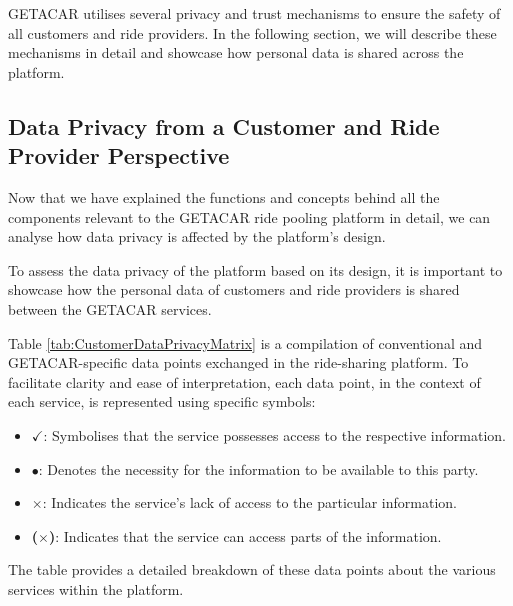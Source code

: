 GETACAR utilises several privacy and trust mechanisms to ensure the safety of all customers and ride providers. In the following section, we will describe these mechanisms in detail and showcase how personal data is shared across the platform.

\subsection{Data Privacy from a Customer and Ride Provider Perspective}
Now that we have explained the functions and concepts behind all the components relevant to the GETACAR ride pooling platform in detail, we can analyse how data privacy is  affected by the platform's design.

To assess the data privacy of the platform based on its design, it is important to showcase how the personal data of customers and ride providers is shared between the GETACAR services.

Table \ref{tab:CustomerDataPrivacyMatrix} is a compilation of conventional and GETACAR-specific data points  exchanged in the ride-sharing platform.
To facilitate clarity and ease of interpretation, each data point, in the context of each service, is represented using specific symbols:

\begin{itemize}
    \item \textbf{$\checkmark$}: Symbolises that the service possesses access to the respective information.
    \item \textbf{$\bullet$}: Denotes the necessity for the information to be available to this party.
    \item \textbf{$\times$}: Indicates the service's lack of access to the particular information.
    \item \textbf{($\times$)}: Indicates that the service can access parts of the information.
\end{itemize}

The table provides a detailed breakdown of these data points about the various services within the platform.




